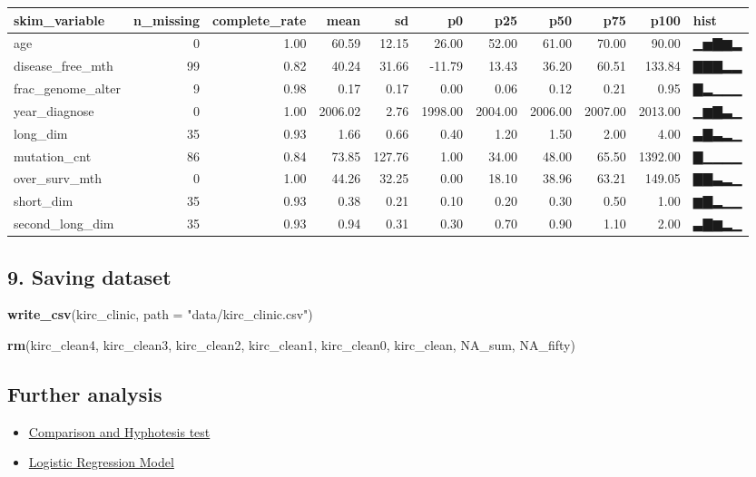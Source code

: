\documentclass[]{article}
\newenvironment{Shaded}{\begin{snugshade}}{\end{snugshade}}
\newcommand{\KeywordTok}[1]{\textcolor[rgb]{0.13,0.29,0.53}{\textbf{#1}}}
\newcommand{\DataTypeTok}[1]{\textcolor[rgb]{0.13,0.29,0.53}{#1}}
\newcommand{\StringTok}[1]{\textcolor[rgb]{0.31,0.60,0.02}{#1}}
\newcommand{\NormalTok}[1]{#1}
\providecommand{\tightlist}{%
  \setlength{\itemsep}{0pt}\setlength{\parskip}{0pt}}
\begin{document}
\begin{longtable}[]{@{}lrrrrrrrrrl@{}}
\toprule
skim\_variable & n\_missing & complete\_rate & mean & sd & p0 & p25 &
p50 & p75 & p100 & hist\tabularnewline
\midrule
\endhead
age & 0 & 1.00 & 60.59 & 12.15 & 26.00 & 52.00 & 61.00 & 70.00 & 90.00 &
▁▅▇▆▂\tabularnewline
disease\_free\_mth & 99 & 0.82 & 40.24 & 31.66 & -11.79 & 13.43 & 36.20
& 60.51 & 133.84 & ▇▇▇▂▂\tabularnewline
frac\_genome\_alter & 9 & 0.98 & 0.17 & 0.17 & 0.00 & 0.06 & 0.12 & 0.21
& 0.95 & ▇▂▁▁▁\tabularnewline
year\_diagnose & 0 & 1.00 & 2006.02 & 2.76 & 1998.00 & 2004.00 & 2006.00
& 2007.00 & 2013.00 & ▁▆▇▃▁\tabularnewline
long\_dim & 35 & 0.93 & 1.66 & 0.66 & 0.40 & 1.20 & 1.50 & 2.00 & 4.00 &
▃▇▃▂▁\tabularnewline
mutation\_cnt & 86 & 0.84 & 73.85 & 127.76 & 1.00 & 34.00 & 48.00 &
65.50 & 1392.00 & ▇▁▁▁▁\tabularnewline
over\_surv\_mth & 0 & 1.00 & 44.26 & 32.25 & 0.00 & 18.10 & 38.96 &
63.21 & 149.05 & ▇▇▃▂▁\tabularnewline
short\_dim & 35 & 0.93 & 0.38 & 0.21 & 0.10 & 0.20 & 0.30 & 0.50 & 1.00
& ▆▇▂▁▁\tabularnewline
second\_long\_dim & 35 & 0.93 & 0.94 & 0.31 & 0.30 & 0.70 & 0.90 & 1.10
& 2.00 & ▃▇▆▂▁\tabularnewline
\bottomrule
\end{longtable}

\subsection{9. Saving dataset}\label{saving-dataset}

\begin{Shaded}
\begin{Highlighting}[]
\KeywordTok{write_csv}\NormalTok{(kirc_clinic, }\DataTypeTok{path =} \StringTok{"data/kirc_clinic.csv"}\NormalTok{)}

\KeywordTok{rm}\NormalTok{(kirc_clean4, kirc_clean3, kirc_clean2, kirc_clean1, kirc_clean0, kirc_clean, NA_sum, NA_fifty)}
\end{Highlighting}
\end{Shaded}

\subsection{Further analysis}\label{further-analysis}

\begin{itemize}
\tightlist
\item
  \href{2.correlation.md}{Comparison and Hyphotesis test}
\item
  \href{3.logistic_regression.md}{Logistic Regression Model}
\end{itemize}
\end{document}
